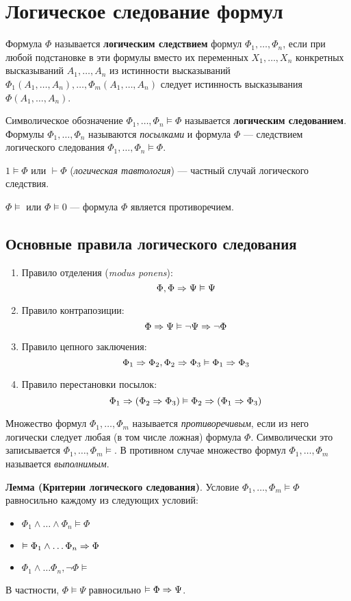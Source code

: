 \section{Логическое следование формул}
\dftion Формула $\Phi$ называется \textbf{логическим следствием} формул $\Phi_1, \dots, \Phi_n$, если при любой подстановке в эти формулы вместо их переменных $X_1, \dots, X_n$ конкретных высказываний $A_1, \dots, A_n$ из истинности высказываний $\Phi_1(A_1, \dots, A_n), \dots, \Phi_m(A_1, \dots, A_n)$ следует истинность высказывания $\Phi(A_1, \dots, A_n)$.

Символическое обозначение $\Phi_1, \dots, \Phi_n \vDash \Phi$ называется \textbf{логическим следованием}. Формулы $\Phi_1, \dots, \Phi_n$ называются \textit{посылками} и формула $\Phi$ --- следствием логического следования $\Phi_1, \dots, \Phi_n \vDash \Phi$.

$1 \vDash \Phi$ или $\vdash \Phi$ (\textit{логическая тавтология}) --- частный случай логического следствия.

$\Phi \vDash$ или $\Phi \vDash 0$ --- формула $\Phi$ является противоречием.

\subsection{Основные правила логического следования}
\begin{enumerate}
    \item Правило отделения (\textit{modus ponens}): $$\Phi, \Phi \Rightarrow \Psi \vDash \Psi$$
    \item Правило контрапозиции: $$\Phi \Rightarrow \Psi \vDash \lnot \Psi \Rightarrow \lnot \Phi$$
    \item Правило цепного заключения: $$\Phi_1 \Rightarrow \Phi_2, \Phi_2 \Rightarrow \Phi_3 \vDash \Phi_1 \Rightarrow \Phi_3$$
    \item Правило перестановки посылок: $$\Phi_1 \Rightarrow (\Phi_2 \Rightarrow \Phi_3) \vDash \Phi_2 \Rightarrow (\Phi_1 \Rightarrow \Phi_3)$$
\end{enumerate}

\dftion Множество формул $\Phi_1, \dots, \Phi_m$ называется \textit{противоречивым}, если из него логически следует любая (в том числе ложная) формула $\Phi$. Символически это записывается $\Phi_1, \dots, \Phi_m \vDash$. В противном случае множество формул $\Phi_1, \dots, \Phi_m$ называется \textit{выполнимым}.

\textbf{Лемма (Критерии логического следования)}. Условие $\Phi_1, \dots, \Phi_m \vDash \Phi$ равносильно каждому из следующих условий:
\begin{itemize}
    \item $\Phi_1 \land \dots \land \Phi_n \vDash \Phi$
    \item $\vDash \Phi_1 \land \dots \Phi_n \Rightarrow \Phi$
    \item $\Phi_1 \land \dots \Phi_n, \lnot \Phi \vDash$
\end{itemize}
В частности, $\Phi \vDash \Psi$ равносильно $\vDash \Phi \Rightarrow \Psi$.

